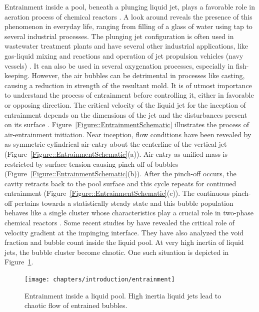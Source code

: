 Entrainment inside a pool, beneath a plunging liquid jet, plays a favorable role in aeration process of chemical reactors \citep{Bin1993}. A look around reveals the presence of this phenomenon in everyday life, ranging from filling of a glass of water using tap to several industrial processes. The plunging jet configuration is often used in wastewater treatment plants \citep{van1979effect} and have several other industrial applications, like gas-liquid mixing and reactions \citep{Mckeogh1981} and operation of jet propulsion vehicles (navy vessels) \citep{deshpande2012computational}. It can also be used in several oxygenation processes, especially in fish-keeping. However, the air bubbles can be detrimental in processes like casting, causing a reduction in strength of the resultant mold. It is of utmost importance to understand the process of entrainment before controlling it, either in favorable or opposing direction. The critical velocity of the liquid jet for the inception of entrainment depends on the dimensions of the jet \citep{lin1966gas,Chanson2004} and the disturbances present on its surface \citep{sene1988air}. Figure~\ref{Figure::EntrainmentSchematic} illustrates the process of air-entrainment initiation. Near inception, flow conditions have been revealed by \citet{Cummings1998,Cummings1999} as symmetric cylindrical air-entry about the centerline of the vertical jet \citep{Roy2013} (Figure~\ref{Figure::EntrainmentSchematic}(a)). Air entry as unified mass is restricted by surface tension causing pinch off of bubbles (Figure~\ref{Figure::EntrainmentSchematic}(b)). After the pinch-off occurs, the cavity retracts back to the pool surface and this cycle repeats for continued entrainment \citep{Roy2013} (Figure~\ref{Figure::EntrainmentSchematic}(c)). The continuous pinch-off pertains towards a statistically steady state and this bubble population behaves like a single cluster whose characteristics play a crucial role in two-phase chemical reactors \citep{Chanson1994,Clanet1997,Bagatur2014,Harby2014}. Some recent studies by \citet{ma2011comprehensive,ma2012two} have revealed the critical role of velocity gradient at the impinging interface. They have also analyzed the void fraction and bubble count inside the liquid pool. At very high inertia of liquid jets, the bubble cluster become chaotic. One such situation is depicted in Figure~\ref{Figure::entrainmentExample}.
\begin{figure}
\centering
\texttt{[image: chapters/introduction/entrainment]}
\caption{Entrainment inside a liquid pool. High inertia liquid jets lead to chaotic flow of entrained bubbles.}
\label{Figure::entrainmentExample}
\end{figure}
